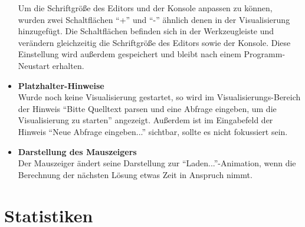 \documentclass[parskip=full,11pt,twoside]{scrartcl}
\begin{document}
\begin{itemize}
        Um die Schriftgröße des Editors und der Konsole anpassen zu können, wurden zwei Schaltflächen \enquote{+} und \enquote{-} ähnlich denen in der Visualisierung hinzugefügt. Die Schaltflächen befinden sich in der Werkzeugleiste und verändern gleichzeitig die Schriftgröße des Editors sowie der Konsole. Diese Einstellung wird außerdem gespeichert und bleibt nach einem Programm-Neustart erhalten.
  \item \textbf{Platzhalter-Hinweise}\\
        Wurde noch keine Visualisierung gestartet, so wird im Visualisierungs-Bereich der Hinweis \enquote{Bitte Quelltext parsen und eine Abfrage eingeben, um die Visualisierung zu starten} angezeigt. Außerdem ist im Eingabefeld der Hinweis \enquote{Neue Abfrage eingeben...} sichtbar, sollte es nicht fokussiert sein.
  \item \textbf{Darstellung des Mauszeigers}\\
        Der Mauszeiger ändert seine Darstellung zur \enquote{Laden...}-Animation, wenn die Berechnung der nächsten Lösung etwas Zeit in Anspruch nimmt.
\end{itemize}

\section{Statistiken}

\end{document}
